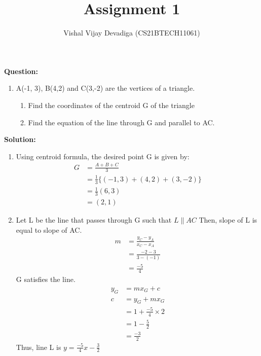 \documentclass[12pt, a4paper]{article}
\newcommand{\solution}{\noindent \textbf{Solution: }}
\newcommand{\question}{\noindent \textbf{Question: }}
\begin{document}
\title{Assignment 1}
\author{Vishal Vijay Devadiga (CS21BTECH11061)}
\maketitle
\question
\begin{enumerate}[label=]
\item A(-1, 3), B(4,2) and C(3,-2) are the vertices of a triangle.
\begin{enumerate}
    \item Find the coordinates of the centroid G of the triangle
    \item Find the equation of the line through G and parallel to AC.
\end{enumerate}
\end{enumerate}
\solution
\begin{enumerate}
\item Using centroid formula,
    the desired point G is given by:
    \begin{align*}
        G&= \frac{A + B + C}{3}
        \\
        &= \frac{1}{3}\{(-1,3)+(4,2)+(3,-2)\}
        \\
        &=\frac{1}{3}(6,3)
        \\
        &=(2,1)
    \end{align*}
\item Let L be the line that passes through G such that $L \parallel AC$
    Then, slope of L is equal to slope of AC.
    \begin{align*}
        m&= \frac{y_C - y_A}{x_C - x_A}
        \\
        &= \frac{-2 - 3}{3 - (-1)}
        \\
        &=\frac{-5}{4}
    \end{align*}
    G satisfies the line.
    \begin{align*}
        y_G&= mx_G + c
        \\
        c&= y_G + mx_G
        \\
        &= 1 + \frac{-5}{4} \times 2
        \\
        &= 1 - \frac{5}{2}
        \\
        &= \frac{-3}{2}
    \end{align*}
    Thus, line L is $y = \frac{-5}{4}x - \frac{3}{2}$
\end{enumerate}
\end{document}
